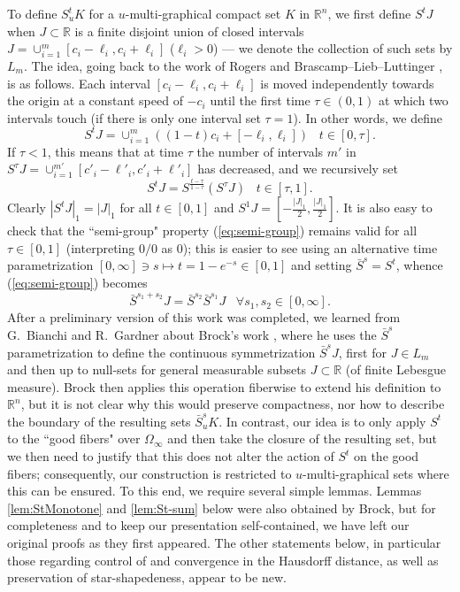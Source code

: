 \documentclass[11pt]{article}
\theoremstyle{definition}
\theoremstyle{proof}
\DeclareMathOperator{\+}{\mathop{\tilde{+}}}
\newcommand{\R}{\mathbb{R}}
\newcommand{\J}{L}
\newcommand{\h}{\ell}
\numberwithin{equation}{section}
\numberwithin{equation}{section}
\begin{document}
To define $S^t_u K$ for a $u$-multi-graphical compact set $K$ in $\R^n$, we first define $S^t J$ when $J \subset \R$ is a finite disjoint union of closed intervals $J = \cup_{i=1}^m [c_i-\h_i,c_i + \h_i]$ ($\h_i > 0$) --- we denote the collection of such sets by $\J_m$. The idea, going back to the work of Rogers \cite{Rogers-BLL} and Brascamp--Lieb--Luttinger \cite{BrascampLiebLuttinger}, is as follows. Each interval $[c_i - \h_i,c_i+\h_i]$ is moved independently towards the origin at a constant speed of $-c_i$ until the first time $\tau \in (0,1)$ at which two intervals touch (if there is only one interval set $\tau = 1$). In other words, we define
\[
S^t J = \cup_{i=1}^m ((1-t) c_i + [-\h_i,\h_i]) \;\;\; t \in [0,\tau] . 
\]
If $\tau < 1$, this means that at time $\tau$ the number of intervals $m'$ in $S^{\tau} J = \cup_{i=1}^{m'} [c'_i - \h'_i,c'_i + \h'_i]$ has decreased, and we recursively set
\begin{equation} \label{eq:semi-group}
S^t J = S^{\frac{t-\tau}{1-\tau}} (S^{\tau} J) \;\;\; t \in [\tau , 1] . 
\end{equation}
Clearly $|S^t J|_1 = |J|_1$ for all $t \in [0,1]$ and $S^1 J = [-\frac{|J|_1}{2} , \frac{|J|_1}{2}]$. It is also easy to check 
that the ``semi-group" property (\ref{eq:semi-group}) remains valid for all $\tau \in [0,1]$ (interpreting $0/0$ as $0$); this is easier to see using an alternative time parametrization $[0,\infty] \ni s \mapsto t = 1 - e^{-s} \in [0,1]$ and setting $\bar S^s = S^t$, whence (\ref{eq:semi-group}) becomes
\[ \bar S^{s_1 + s_2} J = \bar S^{s_2} \bar S^{s_1} J \;\;\; \forall s_1,s_2 \in [0,\infty] . 
\] 
After a preliminary version of this work was completed, we learned from G.~Bianchi and R.~Gardner about Brock's work \cite{Brock-ContSteiner,Brock-ContSteiner2}, where he uses the $\bar S^s$ parametrization to define the continuous symmetrization $\bar S^s J$, first for $J \in \J_m$ and then up to null-sets for general measurable subsets $J \subset \R$ (of finite Lebesgue measure). Brock then applies this operation fiberwise to extend his definition to $\R^n$, but it is not clear why this would preserve compactness, nor how to describe the boundary of the resulting sets $\bar S^s_u K$. In contrast, our idea is to only apply $S^t$ to the ``good fibers" over $\Omega_\infty$ and then take the closure of the resulting set, but we then need to justify that this does not alter the action of $S^t$ on the good fibers; consequently, our construction is restricted to $u$-multi-graphical sets where this can be ensured. To this end, we require several simple lemmas. Lemmas \ref{lem:StMonotone} and \ref{lem:St-sum} below were also obtained by Brock, but for completeness and to keep our presentation self-contained, we have left our original proofs as they first appeared. The other statements below, in particular those regarding control of and convergence in the Hausdorff distance, as well as preservation of star-shapedeness, appear to be new. 
\end{document}
